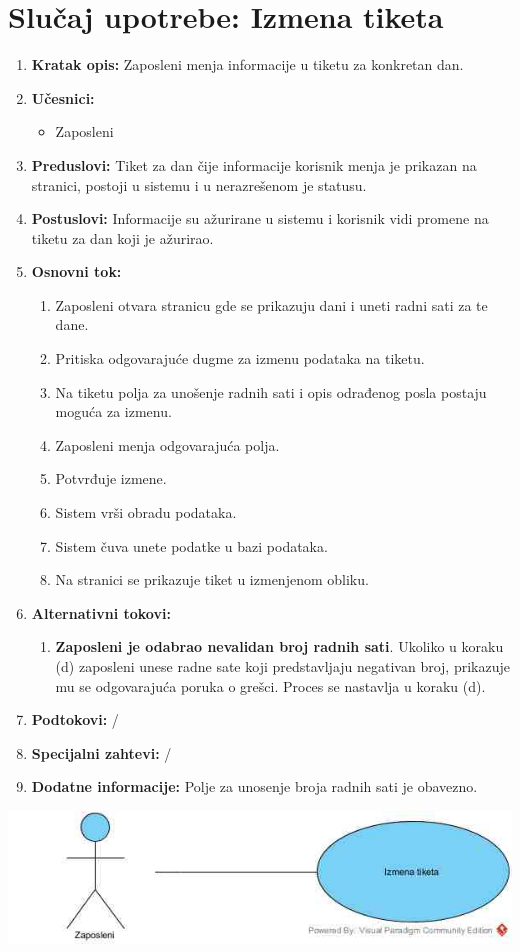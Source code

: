 \documentclass[a4paper]{article}
\begin{document}
\section{Slučaj upotrebe: Izmena tiketa}
\begin{enumerate}
    \item \textbf{Kratak opis:} Zaposleni menja informacije u tiketu za konkretan dan.
    \item \textbf{Učesnici:}
        \begin{itemize}
            \item Zaposleni
        \end{itemize}
    \item \textbf{Preduslovi:} Tiket za dan čije informacije korisnik menja je prikazan na stranici, postoji u sistemu i u nerazrešenom je statusu.
    \item \textbf{Postuslovi:} Informacije su ažurirane u sistemu i korisnik vidi promene na tiketu za dan koji je ažurirao.
    \item \textbf{Osnovni tok:}
        \begin{enumerate}
            \item Zaposleni otvara stranicu gde se prikazuju dani i uneti radni sati za te dane.
            \item Pritiska odgovarajuće dugme za izmenu podataka na tiketu.
            \item Na tiketu polja za unošenje radnih sati i opis odrađenog posla postaju moguća za izmenu.
            \item Zaposleni menja odgovarajuća polja.
            \item Potvrđuje izmene.
            \item Sistem vrši obradu podataka.
            \item Sistem čuva unete podatke u bazi podataka.
            \item Na stranici se prikazuje tiket u izmenjenom obliku.
        \end{enumerate}
    \item \textbf{Alternativni tokovi:}
        \begin{enumerate}
            \item \textbf{Zaposleni je odabrao nevalidan broj radnih sati}. Ukoliko u koraku (d) zaposleni unese radne sate koji predstavljaju negativan broj, prikazuje mu se odgovarajuća poruka o grešci. Proces se nastavlja u koraku (d).
        \end{enumerate}
    \item \textbf{Podtokovi:} /
    \item \textbf{Specijalni zahtevi:} /
    \item \textbf{Dodatne informacije:} Polje za unosenje broja radnih sati je obavezno.
\end{enumerate}
\includegraphics[scale=0.5]{IzmenaTiketa.jpg}
\end{document}
